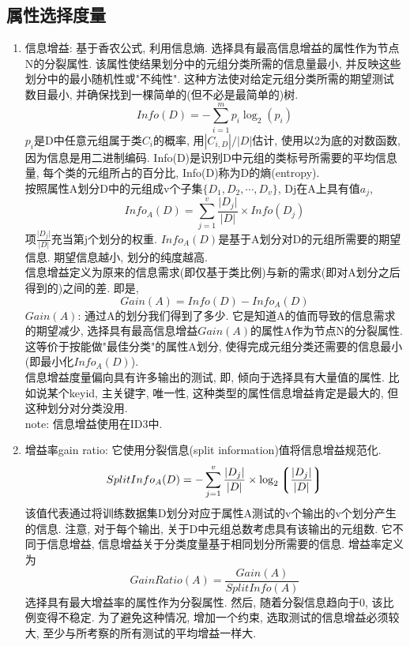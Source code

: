 \documentclass[a4paper,10pt,english]{article}
\begin{document}
\subsection{属性选择度量}
\begin{enumerate}
\item {信息增益:}
基于香农公式, 利用信息熵. 选择具有最高信息增益的属性作为节点N的分裂属性. 该属性使结果划分中的元组分类所需的信息量最小, 并反映这些划分中的最小随机性或"不纯性".  这种方法使对给定元组分类所需的期望测试数目最小, 并确保找到一棵简单的(但不必是最简单的)树.
$$ Info(D) = - \sum_{i=1}^{m}p_i \log_{2}(p_i)$$
$p_i$是D中任意元组属于类$C_i$的概率, 用$|C_{i,D}|/|D|$估计, 使用以2为底的对数函数, 因为信息是用二进制编码. Info(D)是识别D中元组的类标号所需要的平均信息量, 每个类的元组所占的百分比, Info(D)称为D的熵(entropy).\\
按照属性A划分D中的元组成v个子集$\{ D_1, D_2, \cdots, D_v\}$, Dj在A上具有值$a_j$,
$$Info_A(D) = \sum_{j=1}^{v}\frac{\lvert D_j \rvert}{\lvert D \rvert} \times Info(D_j)$$
项$\frac{\lvert D_j \rvert}{\lvert D \rvert}$充当第j个划分的权重. $Info_A(D)$是基于A划分对D的元组所需要的期望信息. 期望信息越小, 划分的纯度越高. \\
信息增益定义为原来的信息需求(即仅基于类比例)与新的需求(即对A划分之后得到的)之间的差. 即是,
$$ Gain(A) = Info(D) - Info_A(D) $$
$Gain(A)$: 通过A的划分我们得到了多少. 它是知道A的值而导致的信息需求的期望减少, 选择具有最高信息增益$Gain(A)$的属性A作为节点N的分裂属性. 这等价于按能做"最佳分类"的属性A划分, 使得完成元组分类还需要的信息最小(即最小化$Info_A(D)$).\\
信息增益度量偏向具有许多输出的测试, 即, 倾向于选择具有大量值的属性. 比如说某个keyid, 主关键字, 唯一性, 这种类型的属性信息增益肯定是最大的, 但这种划分对分类没用.  \\
note: 信息增益使用在ID3中. 
\item {增益率gain ratio:}
它使用分裂信息(split information)值将信息增益规范化. $$ SplitInfo_A(D) = - \sum_{j=1}^{v}\frac{\lvert D_j \rvert}{\lvert D \rvert} \times \log_{2} \left \lgroup \frac{\lvert D_j \rvert}{\lvert D \rvert} \right \rgroup $$
该值代表通过将训练数据集D划分对应于属性A测试的v个输出的v个划分产生的信息. 注意, 对于每个输出, 关于D中元组总数考虑具有该输出的元组数. 它不同于信息增益, 信息增益关于分类度量基于相同划分所需要的信息. 增益率定义为$$ GainRatio(A) = \frac{Gain(A)}{SplitInfo(A)} $$
选择具有最大增益率的属性作为分裂属性. 然后, 随着分裂信息趋向于0, 该比例变得不稳定. 为了避免这种情况, 增加一个约束, 选取测试的信息增益必须较大, 至少与所考察的所有测试的平均增益一样大. \\ 

\end{enumerate}
\end{document}
